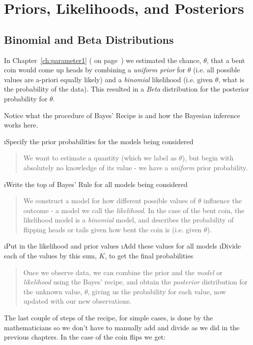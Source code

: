\chapter{Priors, Likelihoods, and Posteriors}\label{ch:priors_posteriors}

\section{Binomial and Beta Distributions}

In Chapter~\ref{ch:parameter1} (\emph{} on page~\pageref{ch:parameter1}) we estimated the chance, $\theta$, that a bent coin would come up heads by combining a {\em uniform prior} for $\theta$ (i.e.  all possible values are a-priori equally likely) and a {\em binomial} likelihood (i.e. given $\theta$, what is the probability of the data).  This resulted in a {\em Beta} distribution for the posterior probability for $\theta$.  

Notice what the procedure of Bayes' Recipe is and how the Bayesian inference works here.  

\be
\i Specify the prior probabilities for the models being considered
\begin{quote}
We want to estimate a quantity (which we label as $\theta$), but begin with absolutely no knowledge of its value - we have a {\em uniform} prior probability.  
\end{quote}
\i Write the top of Bayes' Rule for all models being considered
\begin{quote}
 We construct a model for how different possible values of $\theta$ influence the outcome - a model we call the {\em likelihood}.  In the case of the bent coin, the likelihood model is a {\em binomial} model, and describes the probability of flipping heads or tails given how bent the coin is (i.e. given $\theta$). 
\end{quote}
\i Put in the likelihood and prior values
\i Add these values for all models
\i Divide each of the values by this sum, $K$, to get the final probabilities
\begin{quote}
 Once we observe data, we can combine the {\rm prior} and the {\em model} or {\em likelihood} using the Bayes' recipe, and obtain the {\em posterior} distribution for the unknown value, $\theta$, giving us the probability for each value, now updated with our new observations.  
\end{quote}
\ee

The last couple of steps of the recipe, for simple cases, is done by the mathematicians so we don't have to manually add and divide as we did in the previous chapters.  In the case of the coin flips we get:

